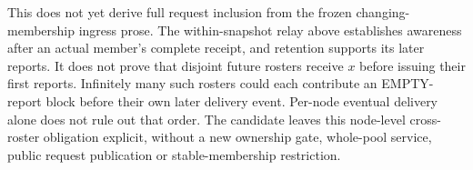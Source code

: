 This does not yet derive full request inclusion from the frozen
changing-membership ingress prose. The within-snapshot relay above
establishes awareness after an actual member's complete receipt, and
retention supports its later reports. It does not prove that disjoint
future rosters receive $x$ before issuing their first reports. Infinitely
many such rosters could each contribute an EMPTY-report block before
their own later delivery event. Per-node eventual delivery alone does
not rule out that order. The candidate leaves this node-level
cross-roster obligation explicit, without a new ownership gate,
whole-pool service, public request publication or stable-membership
restriction.
